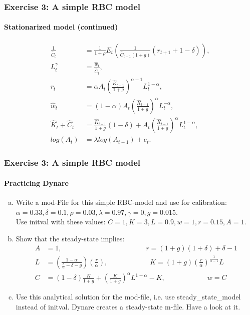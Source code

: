 \documentclass{beamer} %
\begin{document}
\begin{frame}\frametitle{Exercise 3: A simple RBC model}
  \framesubtitle{Stationarized model (continued)}
  \begin{align*}
    \frac{1}{\widehat{C}_t}&=\frac{1}{1+\rho}E_t\left(\frac{1}{\widehat{C}_{t+1}(1+g)}(r_{t+1}+1-\delta)\right),\\
    L_t^\gamma&=\frac{\widehat{w}_t}{\widehat{C}_t},\\
    r_t &= \alpha A_t\left(\frac{\widehat{K}_{t-1}}{1+g}\right)^{\alpha-1}L_t^{1-\alpha},\\
    \widehat{w}_t &= (1-\alpha) A_t\left(\frac{\widehat{K}_{t-1}}{1+g}\right)^\alpha L_t^{-\alpha},\\
    \widehat{K}_t+\widehat{C}_t &= \frac{\widehat{K}_{t-1}}{1+g}(1-\delta)+A_t\left(\frac{\widehat{K}_{t-1}}{1+g}\right)^\alpha L_t^{1-\alpha},\\
    log(A_{t})&=\lambda log(A_{t-1}) + e_{t}.
  \end{align*}
\end{frame}

\begin{frame}\frametitle{Exercise 3: A simple RBC model}\framesubtitle{Practicing Dynare}
\begin{enumerate}[(a)]
  \item Write a mod-File for this simple RBC-model and use for calibration:
$\alpha=0.33, \delta=0.1, \rho = 0.03,\lambda=0.97, \gamma=0, g = 0.015$. \\Use initval with these values:
$C=1,K=3,L=0.9,w=1,r=0.15,A=1$.
\item Show that the steady-state implies:
\begin{align*}
  A &=1, \qquad \qquad\qquad\qquad \qquad\qquad r =(1+g)(1+\delta) + \delta -1\\
  L &= \left(\frac{1-\alpha}{\frac{r}{\alpha}-\delta-g}\right) \left(\frac{r}{\alpha}\right),\qquad \qquad\qquad
  K = (1+g)\left(\frac{r}{\alpha}\right)^{\frac{1}{\alpha-1}} L\\
  C &= (1-\delta) \frac{K}{1+g} + \left(\frac{K}{1+g}\right)^\alpha L ^{1-\alpha} - K, \qquad \qquad\qquad
  w = C
\end{align*}
\item Use this analytical solution for the mod-file, i.e. use steady\_state\_model instead of initval. Dynare creates a steady-state m-file. Have a look at it.
\end{enumerate}

\end{frame}
\end{document}
